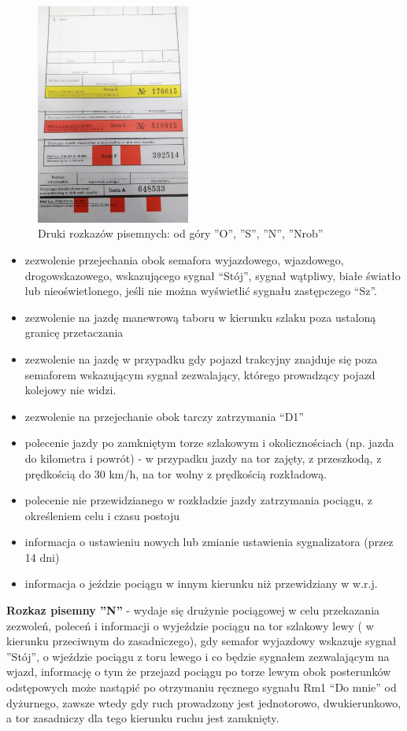 	\begin{figure}
		\includegraphics[width=0.45\textwidth]{skryptkierownik-img/rozkazy-pisemne.jpg}
		\caption{Druki rozkazów pisemnych: od góry ''O'', ''S'', ''N'', ''Nrob''}
	\end{figure}
\begin{itemize}
\item zezwolenie przejechania obok semafora wyjazdowego, wjazdowego, drogowskazowego, wskazującego sygnał “Stój”, sygnał
wątpliwy, białe światło lub nieoświetlonego, jeśli nie można wyświetlić sygnału zastępczego “Sz”.
\item zezwolenie na jazdę manewrową taboru w kierunku szlaku poza ustaloną granicę przetaczania
\item zezwolenie na jazdę w przypadku gdy pojazd trakcyjny znajduje się poza semaforem wskazującym sygnał zezwalający,
którego prowadzący pojazd kolejowy nie widzi.
\item zezwolenie na przejechanie obok tarczy zatrzymania “D1”
\item polecenie jazdy po zamkniętym torze szlakowym i okolicznościach (np. jazda do kilometra i powrót) - w przypadku jazdy na tor zajęty, z przeszkodą, z prędkością do 30 km/h, na tor wolny z prędkością rozkładową.
\item polecenie nie przewidzianego w rozkładzie jazdy zatrzymania pociągu, z określeniem celu i czasu postoju
\item informacja o ustawieniu nowych lub zmianie ustawienia sygnalizatora (przez 14 dni)
\item informacja o jeździe pociągu w innym kierunku niż przewidziany w w.r.j.
\end{itemize}

\textbf{Rozkaz pisemny ''N'' } - wydaje się drużynie pociągowej w celu przekazania zezwoleń, poleceń i informacji o wyjeździe pociągu na tor szlakowy lewy ( w kierunku przeciwnym do zasadniczego), gdy semafor wyjazdowy wskazuje sygnał ''Stój'', o wjeździe pociągu z toru lewego i co będzie sygnałem zezwalającym na wjazd, informację o tym że przejazd pociągu po torze lewym obok posterunków odstępowych może nastąpić po otrzymaniu ręcznego sygnału Rm1 “Do mnie” od dyżurnego, zawsze wtedy gdy ruch prowadzony jest jednotorowo, dwukierunkowo, a tor zasadniczy dla tego kierunku ruchu  jest zamknięty.

